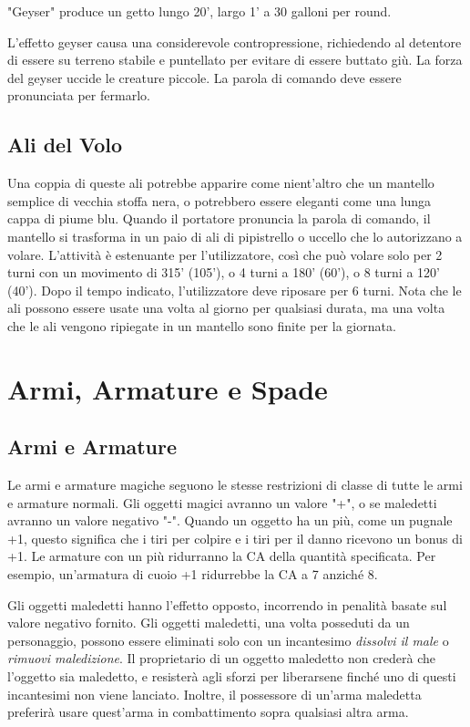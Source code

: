 \documentclass{article}
\begin{document}
\begin{multicols}{2}
"Geyser" produce un getto lungo 20', largo 1' a 30 galloni per round.

L'effetto geyser causa una considerevole contropressione, richiedendo al detentore di essere su terreno stabile e puntellato per evitare di essere buttato giù. La forza del geyser uccide le creature piccole. La parola di comando deve essere pronunciata per fermarlo.

\subsection{Ali del Volo}
Una coppia di queste ali potrebbe apparire come nient'altro che un mantello semplice di vecchia stoffa nera, o potrebbero essere eleganti come una lunga cappa di piume blu. Quando il portatore pronuncia la parola di comando, il mantello si trasforma in un paio di ali di pipistrello o uccello che lo autorizzano a volare. L'attività è estenuante per l'utilizzatore, così che può volare solo per 2 turni con un movimento di 315' (105'), o 4 turni a 180' (60'), o 8 turni a 120' (40'). Dopo il tempo indicato, l'utilizzatore deve riposare per 6 turni. Nota che le ali possono essere usate una volta al giorno per qualsiasi durata, ma una volta che le ali vengono ripiegate in un mantello sono finite per la giornata.

\section{Armi, Armature e Spade}

\subsection{Armi e Armature}
Le armi e armature magiche seguono le stesse restrizioni di classe di tutte le armi e armature normali. Gli oggetti magici avranno un valore "+", o se maledetti avranno un valore negativo "-". Quando un oggetto ha un più, come un pugnale +1, questo significa che i tiri per colpire e i tiri per il danno ricevono un bonus di +1. Le armature con un più ridurranno la CA della quantità specificata. Per esempio, un'armatura di cuoio +1 ridurrebbe la CA a 7 anziché 8.

Gli oggetti maledetti hanno l'effetto opposto, incorrendo in penalità basate sul valore negativo fornito. Gli oggetti maledetti, una volta posseduti da un personaggio, possono essere eliminati solo con un incantesimo \textit{dissolvi il male} o \textit{rimuovi maledizione}. Il proprietario di un oggetto maledetto non crederà che l'oggetto sia maledetto, e resisterà agli sforzi per liberarsene finché uno di questi incantesimi non viene lanciato. Inoltre, il possessore di un'arma maledetta preferirà usare quest'arma in combattimento sopra qualsiasi altra arma.


\end{multicols}
\end{document}
